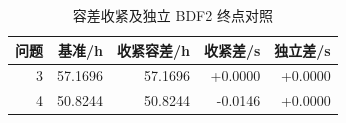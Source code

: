 \begin{table}[H]\centering\small\caption{容差收紧及独立 BDF2 终点对照}\label{tab:p2}
\begin{tabular}{rrrrr}\toprule 问题&基准/h&收紧容差/h&收紧差/s&独立差/s\\\midrule
3&57.1696&57.1696&+0.0000&+0.0000\\
4&50.8244&50.8244&-0.0146&+0.0000\\
\bottomrule\end{tabular}\end{table}